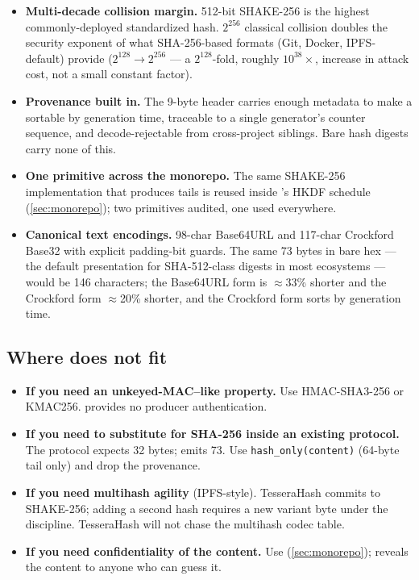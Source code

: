 \begin{itemize}
\item \textbf{Multi-decade collision margin.} 512-bit SHAKE-256 is the highest commonly-deployed standardized hash. $2^{256}$ classical collision doubles the security exponent of what SHA-256-based formats (Git, Docker, IPFS-default) provide ($2^{128} \to 2^{256}$ --- a $2^{128}$-fold, roughly $10^{38}\times$, increase in attack cost, not a small constant factor).
\item \textbf{Provenance built in.} The 9-byte header carries enough metadata to make a \tesserahash{} sortable by generation time, traceable to a single generator's counter sequence, and decode-rejectable from cross-project siblings. Bare hash digests carry none of this.
\item \textbf{One primitive across the monorepo.} The same SHAKE-256 implementation that produces \tesserahash{} tails is reused inside \tesseraseal{}'s HKDF schedule (\cref{sec:monorepo}); two primitives audited, one used everywhere.
\item \textbf{Canonical text encodings.} 98-char Base64URL and 117-char Crockford Base32 with explicit padding-bit guards. The same 73 bytes in bare hex --- the default presentation for SHA-512-class digests in most ecosystems --- would be 146 characters; the Base64URL form is $\approx$33\% shorter and the Crockford form $\approx$20\% shorter, and the Crockford form sorts by generation time.
\end{itemize}

\subsection{Where \tesserahash{} does not fit}

\begin{itemize}
\item \textbf{If you need an unkeyed-MAC--like property.} Use HMAC-SHA3-256 or KMAC256. \tesserahash{} provides no producer authentication.
\item \textbf{If you need to substitute for SHA-256 inside an existing protocol.} The protocol expects 32 bytes; \tesserahash{} emits 73. Use \texttt{hash\_only(content)} (64-byte tail only) and drop the provenance.
\item \textbf{If you need multihash agility} (IPFS-style). TesseraHash commits to SHAKE-256; adding a second hash requires a new variant byte under the \tessera{} discipline. TesseraHash will not chase the multihash codec table.
\item \textbf{If you need confidentiality of the content.} Use \tesseraseal{} (\cref{sec:monorepo}); \tesserahash{} reveals the content to anyone who can guess it.
\end{itemize}
